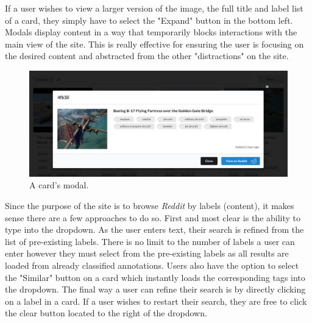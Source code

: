 \documentclass[msc,oneside]{ubcthesis}%
\begin{document}
\par
If a user wishes to view a larger version of the image, the full title and label list of a card, they simply have to select the "Expand" button in the bottom left. Modals display content in a way that temporarily blocks interactions with the main view of the site. This is really effective for ensuring the user is focusing on the desired content and abstracted from the other "distractions" on the site.
\begin{figure}[H]
\includegraphics[width=\textwidth]{modal.png}
\caption{A card's modal.}
\end{figure}
\par
Since the purpose of the site is to browse \textit{Reddit} by labels (content), it makes sense there are a few approaches to do so. First and most clear is the ability to type into the dropdown. As the user enters text, their search is refined from the list of pre-existing labels. There is no limit to the number of labels a user can enter however they must select from the pre-existing labels as all results are loaded from already classified annotations. Users also have the option to select the "Similar" button on a card which instantly loads the corresponding tags into the dropdown. The final way a user can refine their search is by directly clicking on a label in a card. If a user wishes to restart their search, they are free to click the clear button located to the right of the dropdown.
\end{document}
